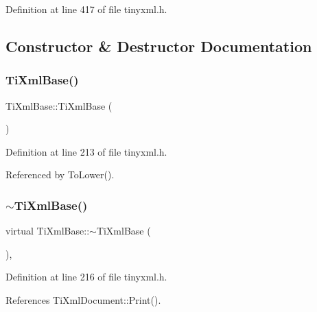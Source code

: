 Definition at line 417 of file tinyxml.\+h.



\subsection{Constructor \& Destructor Documentation}
\hypertarget{class_ti_xml_base_ac6753fe8a2c89669038fcf281cb301bf}{}\label{class_ti_xml_base_ac6753fe8a2c89669038fcf281cb301bf} 
\subsubsection{\texorpdfstring{Ti\+Xml\+Base()}{TiXmlBase()}\hspace{0.1cm}{\footnotesize\ttfamily [1/2]}}
{\footnotesize\ttfamily Ti\+Xml\+Base\+::\+Ti\+Xml\+Base (\begin{DoxyParamCaption}{ }\end{DoxyParamCaption})\hspace{0.3cm}{\ttfamily [inline]}}



Definition at line 213 of file tinyxml.\+h.



Referenced by To\+Lower().

\hypertarget{class_ti_xml_base_ad1837ecb25a913612fa1115f090cbb56}{}\label{class_ti_xml_base_ad1837ecb25a913612fa1115f090cbb56} 
\subsubsection{\texorpdfstring{$\sim$\+Ti\+Xml\+Base()}{~TiXmlBase()}}
{\footnotesize\ttfamily virtual Ti\+Xml\+Base\+::$\sim$\+Ti\+Xml\+Base (\begin{DoxyParamCaption}{ }\end{DoxyParamCaption})\hspace{0.3cm}{\ttfamily [inline]}, {\ttfamily [virtual]}}



Definition at line 216 of file tinyxml.\+h.



References Ti\+Xml\+Document\+::\+Print().

\hypertarget{class_ti_xml_base_a626975d7fb27b0a471142ca582b561b4}{}\label{class_ti_xml_base_a626975d7fb27b0a471142ca582b561b4} 
